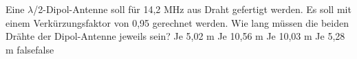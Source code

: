     {Eine $\lambda$/2-Dipol-Antenne soll für 14,2 MHz aus Draht gefertigt werden. Es soll mit einem Verkürzungsfaktor von 0,95 gerechnet werden. Wie lang müssen die beiden Drähte der Dipol-Antenne jeweils sein?}
    {Je 5,02 m}
    {Je 10,56 m}
    {Je 10,03 m}
    {Je 5,28 m}
    {false}{false}